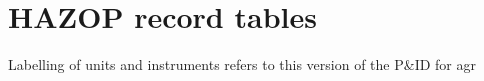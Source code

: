 \section{HAZOP record tables}

Labelling of units and instruments refers to this version of the P\&ID for agr







